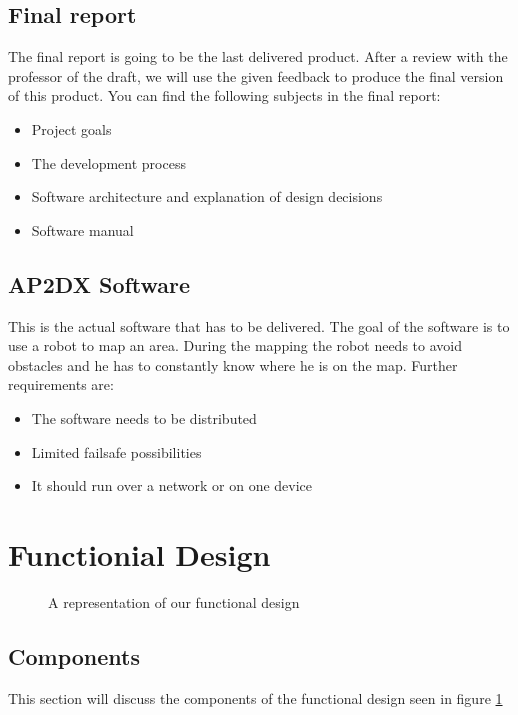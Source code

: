 \documentclass[a4paper, notitlepage]{article}
\begin{document}
\subsection{Final report}
The final report is going to be the last delivered product. After a review with
the professor of the draft, we will use the given feedback to produce the final version of this product. You can find the following subjects 
in the final report: 
\begin{itemize}
\item Project goals
\item The development process
\item Software architecture and explanation of design decisions
\item Software manual
\end{itemize}

\subsection{AP2DX Software}
This is the actual software that has to be delivered. The goal of the software
is to use a robot to map an area. During the mapping the robot needs to avoid
obstacles and he has to constantly know where he is on the map. Further
requirements are:
\begin{itemize}
\item The software needs to be distributed
\item Limited failsafe possibilities
\item It should run over a network or on one device
\end{itemize}



\section{Functionial Design}
\begin{figure}
\centering
{}
\caption{A representation of our functional design}
\label{fig:fd}
\end{figure}

\subsection{Components}
This section will discuss the components of the functional design seen in figure
\ref{fig:fd}
\end{document}
